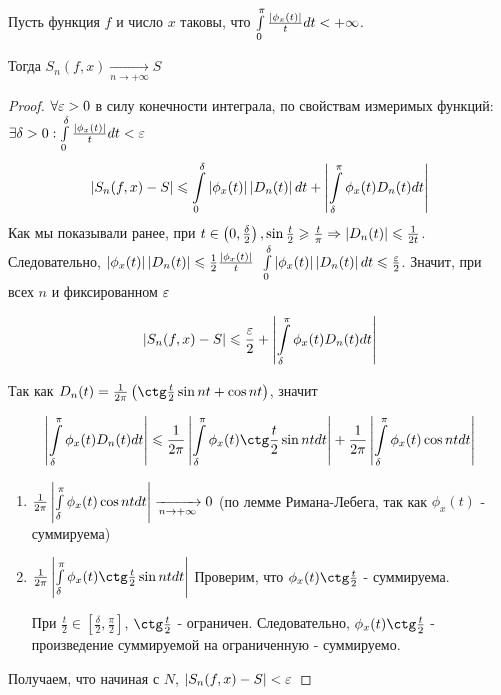 \begin{theorem}
	Пусть функция $f$ и число $x$ таковы, что $\int\limits_{0}^{\pi} \frac{\left|\phi_x(t)\right|}{t}dt < +\infty$.
	
	Тогда $S_n(f, x) \xrightarrow[n \rightarrow +\infty]{} S$
\end{theorem}

\begin{proof}
	$\forall\varepsilon > 0$ в силу конечности интеграла, по свойствам измеримых функций:
	$\\ \exists \delta > 0: \int\limits_{0}^{\delta} \frac{\left|\phi_x(t)\right|}{t}dt < \varepsilon$
	\begin{gather*}
		\left|S_n(f, x) - S\right| \leqslant \int\limits_{0}^{\delta}\left|\phi_x(t)\right|\left|D_n(t)\right|dt +
		\left|\int\limits_{\delta}^{\pi} \phi_x(t) D_n(t) dt\right|
	\end{gather*}
	Как мы показывали ранее, при $t \in \left( 0 , \frac{\delta}{2}\right), 
	\sin \frac{t}{2} \geqslant \frac{t}{\pi} \Rightarrow \left|D_n(t)\right| \leqslant \frac{1}{2t} $.
	Следовательно, $\left|\phi_x(t)\right| \left|D_n(t)\right| \leqslant \frac{1}{2} \frac{\left|\phi_x(t)\right|}{t}$
	$\\ \int\limits_{0}^{\delta} \left|\phi_x(t)\right| \left|D_n(t)\right| dt \leqslant \frac{\varepsilon}{2}$.
	Значит, при всех $n$ и фиксированном $\varepsilon$ 
	
	\begin{gather*}
		\left|S_n(f, x) - S\right| \leqslant \frac{\varepsilon}{2} + 
		\left|\int\limits_{\delta}^{\pi} \phi_x(t) D_n(t)dt\right|
	\end{gather*}

	Так как $D_n(t) = \frac{1}{2\pi} \left( \ctg\frac{t}{2}\sin nt + \cos nt\right)$, значит

	\begin{gather*}
		\abs{\intlr{\delta}{\pi} \phi_x(t)D_n(t)dt} \leqslant 
		\frac{1}{2\pi}\abs{\intlr{\delta}{\pi} \phi_x(t) \ctg\frac{t}{2}\sin nt dt} +
		\frac{1}{2\pi}\abs{\intlr{\delta}{\pi} \phi_x(t)\cos nt dt}
	\end{gather*}

	\begin{enumerate}
		\item $\frac{1}{2\pi}\left|\int\limits_{\delta}^{\pi} \phi_x(t)\cos nt dt\right| 
			\xrightarrow[n \rightarrow +\infty]{} 0$ 
			(по лемме Римана-Лебега, так как $\phi_x(t)$ - суммируема)
		\item $\frac{1}{2\pi}\abs{\intlr{\delta}{\pi} \phi_x(t) \ctg\frac{t}{2}\sin nt dt}$
			Проверим, что $\phi_x(t)\ctg\frac{t}{2}$ - суммируема.
			
			При $\frac{t}{2} \in \left[\frac{\delta}{2}, \frac{\pi}{2} \right]$, 
			$\ctg\frac{t}{2}$ - ограничен. Следовательно, 
			$\phi_x(t)\ctg\frac{t}{2}$ - произведение суммируемой на ограниченную - суммируемо.
	\end{enumerate}
	Получаем, что начиная с $N$, $\left|S_n(f, x) - S\right| < \varepsilon$
\end{proof}

